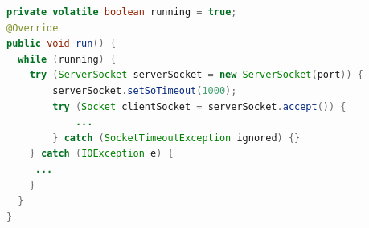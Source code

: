 \begin{minipage}{\linewidth}
	\begin{lstlisting}[language=Java, caption={Interface prescribes a sendMessage method},captionpos=b,label=lst:runServer]
private volatile boolean running = true;
@Override
public void run() {
  while (running) {
	try (ServerSocket serverSocket = new ServerSocket(port)) {
		serverSocket.setSoTimeout(1000);
		try (Socket clientSocket = serverSocket.accept()) {
			...
		} catch (SocketTimeoutException ignored) {}
	} catch (IOException e) {
	 ...
	}
  }
}
	\end{lstlisting}
\end{minipage}
